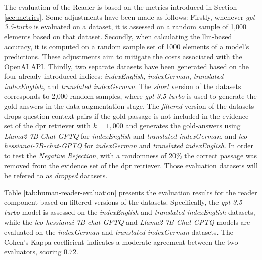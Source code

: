 The evaluation of the Reader is based on the metrics introduced in Section \ref{sec:metrics}. Some adjustments have been made as follows: Firstly, whenever \textit{gpt-3.5-turbo} is evaluated on a dataset, it is assessed on a random sample of 1,000 elements based on that dataset. Secondly, when calculating the \gls{llm}-based accuracy, it is computed on a random sample set of 1000 elements of a model's predictions. These adjustments aim to mitigate the costs associated with the OpenAI API. Thirdly, two separate datasets have been generated based on the four already introduced indices: \textit{indexEnglish}, \textit{indexGerman}, \textit{translated indexEnglish}, and \textit{translated indexGerman}. The \textit{short} version of the datasets corresponds to 2,000 random samples, where \textit{gpt-3.5-turbo} is used to generate the gold-answers in the data augmentation stage. The \textit{filtered} version of the datasets drops question-context pairs if the gold-passage is not included in the evidence set of the \gls{dpr} retriever with $k = 1,000$ and generates the gold-answers using \textit{Llama2-7B-Chat-GPTQ} for \textit{indexEnglish} and \textit{translated indexGerman}, and \textit{leo-hessianai-7B-chat-GPTQ} for \textit{indexGerman} and \textit{translated indexEnglish}. In order to test the \textit{Negative Rejection}, with a randomness of 20\% the correct passage was removed from the evidence set of the \gls{dpr} retriever. Those evaluation datasets will be refered to as \textit{dropped} datasets. 

Table \ref{tab:human-reader-evaluation} presents the evaluation results for the reader component based on filtered versions of the datasets. Specifically, the \textit{gpt-3.5-turbo} model is assessed on the \textit{indexEnglish} and \textit{translated indexEnglish} datasets, while the \textit{leo-hessianai-7B-chat-GPTQ} and \textit{Llama2-7B-Chat-GPTQ} models are evaluated on the \textit{indexGerman} and \textit{translated indexGerman} datasets. The Cohen's Kappa coefficient indicates a moderate agreement between the two evaluators, scoring $0.72$.

